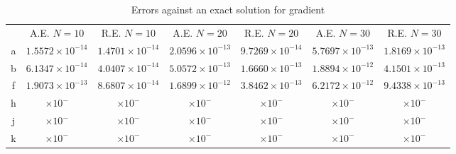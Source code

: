 \documentclass[11pt, a4paper]{article}
\theoremstyle{definition}
\begin{document}
\begin{table}
	\caption{Errors against an exact solution for gradient}
	\begin{tabular}{ ||c| c| c| c| c |c|c|| }
		\hline
		\hline
		& A.E. $N =10$ & R.E. $N =10$ &A.E. $N =20$ & R.E. $N =20$ &A.E. $N =30$ & R.E. $N =30$ \\ 
		a& $ 1.5572\times 10^{- 14}$ & $ 1.4701\times 10^{- 14}$ & $2.0596 \times 10^{-13 }$ & $9.7269 \times 10^{-14 }$ &$ 5.7697\times 10^{-13 }$ & $1.8169 \times 10^{-13 }$ \\
		b& $ 6.1347\times 10^{- 14}$ & $4.0407 \times 10^{-14 }$ & $ 5.0572\times 10^{- 13}$ & $ 1.6660\times 10^{- 13}$ &$1.8894 \times 10^{- 12}$ & $ 4.1501\times 10^{- 13}$ \\
		f& $ 1.9073\times 10^{-13 }$ & $ 8.6807\times 10^{-14 }$ & $1.6899 \times 10^{-12 }$ & $ 3.8462\times 10^{- 13}$ &$ 6.2172\times 10^{-12 }$ & $ 9.4338\times 10^{- 13}$ \\
		\hline
		h& $ \times 10^{- }$ & $ \times 10^{- }$ & $ \times 10^{- }$ & $ \times 10^{- }$ &$ \times 10^{- }$ & $ \times 10^{- }$ \\
		j& $ \times 10^{- }$ & $ \times 10^{- }$ & $ \times 10^{- }$ & $ \times 10^{- }$ &$ \times 10^{- }$ & $ \times 10^{- }$ \\
		k& $ \times 10^{- }$ & $ \times 10^{- }$ & $ \times 10^{- }$ & $ \times 10^{- }$ &$ \times 10^{- }$ & $ \times 10^{- }$ \\
		\hline
	\end{tabular}
\label{Tab:Grad}
\end{table}
\end{document}
